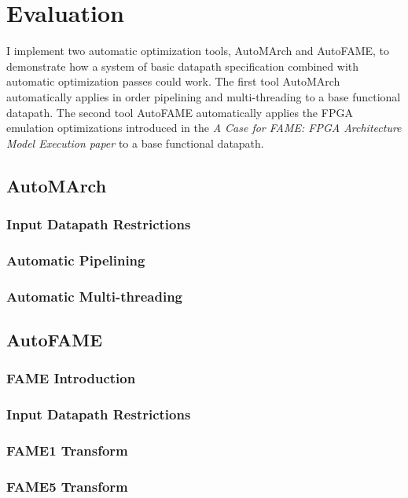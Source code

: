 \section{Evaluation}
I implement two automatic optimization tools, AutoMArch and AutoFAME, to demonstrate how a system of basic datapath specification combined with automatic optimization passes could work. The first tool AutoMArch automatically applies in order pipelining and multi-threading to a base functional datapath. The second tool AutoFAME automatically applies the FPGA emulation optimizations introduced in the \textit{A Case for FAME: FPGA Architecture Model Execution paper} \cite{FAME:2010} to a base functional datapath.

\subsection{AutoMArch}
\subsubsection{Input Datapath Restrictions}
\subsubsection{Automatic Pipelining}
\subsubsection{Automatic Multi-threading}
\subsection{AutoFAME}
\subsubsection{FAME Introduction}
\subsubsection{Input Datapath Restrictions}
\subsubsection{FAME1 Transform}
\subsubsection{FAME5 Transform}

